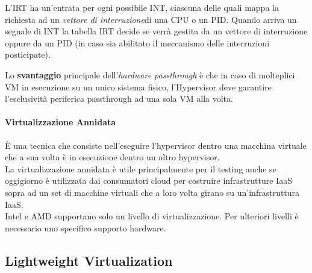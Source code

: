 \documentclass{article}
\begin{document}
L’IRT ha un’entrata per ogni possibile INT, ciascuna delle quali mappa la richiesta ad un \textit{vettore di interruzione}\footnotemark  di una CPU o un PID. Quando arriva un segnale di INT la tabella IRT decide se verrà gestita da un vettore di interruzione oppure da un PID (in caso sia abilitato il meccanismo delle interruzioni posticipate).

Lo \textbf{svantaggio} principale dell'\textit{hardware passthrough} è che in caso di molteplici VM in esecuzione su un unico sistema fisico, l'Hypervisor deve garantire l'esclusività periferica passthrough ad una sola VM alla volta.

\paragraph{Virtualizzazione Annidata}
È una tecnica che consiste nell’eseguire l’hypervisor dentro una macchina virtuale che a sua volta è in esecuzione dentro un altro hypervisor.\\
La virtualizzazione annidata è utile principalmente per il testing anche se oggigiorno è utilizzata dai consumatori cloud per costruire infrastrutture IaaS sopra ad un set di macchine virtuali che a loro volta girano su un’infrastruttura IaaS.\\
Intel e AMD supportano solo un livello di virtualizzazione. Per ulteriori livelli è necessario uno specifico supporto hardware.

\newpage
\subsection{Lightweight Virtualization}
\end{document}

